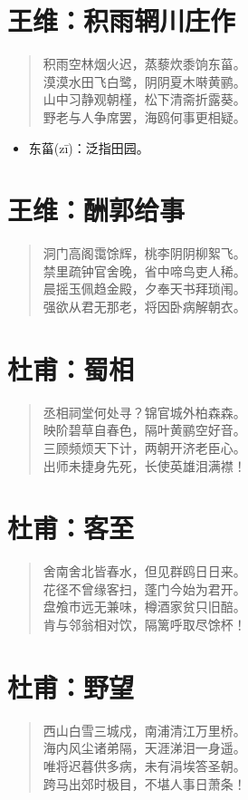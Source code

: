 \documentclass[12pt,oneside]{book}
\newenvironment{shici}{%
\begin{verse}\centering\yanti\large\hspace{12pt}}{\end{verse}}
\begin{document}
\begin{common-format}
\chapter{王维：积雨辋川庄作}
\begin{shici}
积雨空林烟火迟，蒸藜炊黍饷东菑。\\
漠漠水田飞白鹭，阴阴夏木啭黄鹂。\\
山中习静观朝槿，松下清斋折露葵。\\
野老与人争席罢，海鸥何事更相疑。
\end{shici}

\begin{itemize}
\item 东菑(zī)：泛指田园。
\end{itemize}

\chapter{王维：酬郭给事}
\begin{shici}
洞门高阁霭馀辉，桃李阴阴柳絮飞。\\
禁里疏钟官舍晚，省中啼鸟吏人稀。\\
晨摇玉佩趋金殿，夕奉天书拜琐闱。\\
强欲从君无那老，将因卧病解朝衣。
\end{shici}

\chapter{杜甫：蜀相}
\begin{shici}
丞相祠堂何处寻？锦官城外柏森森。\\
映阶碧草自春色，隔叶黄鹂空好音。\\
三顾频烦天下计，两朝开济老臣心。\\
出师未捷身先死，长使英雄泪满襟！
\end{shici}

\chapter{杜甫：客至}
\begin{shici}
舍南舍北皆春水，但见群鸥日日来。\\
花径不曾缘客扫，蓬门今始为君开。\\
盘飧市远无兼味，樽酒家贫只旧醅。\\
肯与邻翁相对饮，隔篱呼取尽馀杯！
\end{shici}

\chapter{杜甫：野望}
\begin{shici}
西山白雪三城戍，南浦清江万里桥。\\
海内风尘诸弟隔，天涯涕泪一身遥。\\
唯将迟暮供多病，未有涓埃答圣朝。\\
跨马出郊时极目，不堪人事日萧条！
\end{shici}


\end{common-format}
\end{document}

